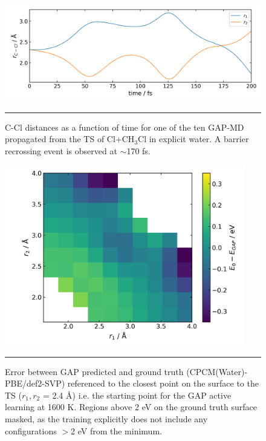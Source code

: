 \documentclass[../../main.tex]{subfiles}
\begin{document}
\begin{figure}[h!]
	\vspace{0.4cm}
	\centering
	\includegraphics[width=11.5cm]{6/gap/figs_si/fig22}
	\vspace{0.2cm}
	\hrule
	\caption{C-Cl distances as a function of time for one of the ten GAP-MD propagated from the TS of Cl+CH${}_3$Cl in explicit water. A barrier recrossing event is observed at $\sim$170 fs.}
	\label{fig::ml_si_22}
\end{figure}



\begin{figure}[h!]
	\vspace{0.4cm}
	\centering
	\includegraphics[width=10.5cm]{6/gap/figs_si/fig23}
	\vspace{0.2cm}
	\hrule
	\caption{Error between GAP predicted and ground truth (CPCM(Water)-PBE/def2-SVP) referenced to the closest point on the surface to the TS ($r_1, r_2 $ = 2.4 \AA) i.e. the starting point for the GAP active learning at 1600 K. Regions above 2 eV on the ground truth surface masked, as the training explicitly does not include any configurations $>$2 eV from the minimum. }
	\label{fig::ml_si_23}
\end{figure}
\end{document}
